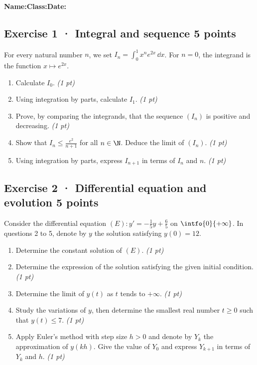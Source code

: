 \smallskip\textbf{Name:}\enspace\dotfill\quad\textbf{Class:}\enspace\dotfill\quad\textbf{Date:}\enspace\dotfill

\subsection*{Exercise 1 · Integral and sequence \hfill 5 points}For every natural number $n$, we set $I_n=\displaystyle\int_0^1x^ne^{2x}\,\dd x$. For $n=0$, the integrand is the function $x\mapsto e^{2x}$.

\begin{enumerate}

\item Calculate $I_0$. \hfill\textit{(1 pt)}

\item Using integration by parts, calculate $I_1$. \hfill\textit{(1 pt)}

\item Prove, by comparing the integrands, that the sequence $(I_n)$ is positive and decreasing. \hfill\textit{(1 pt)}

\item Show that $I_n\le\frac{e^{2}}{n+1}$ for all $n\in\N$. Deduce the limit of $(I_n)$. \hfill\textit{(1 pt)}

\item Using integration by parts, express $I_{n+1}$ in terms of $I_n$ and $n$. \hfill\textit{(1 pt)}

\end{enumerate}

\subsection*{Exercise 2 · Differential equation and evolution \hfill 5 points}Consider the differential equation $(E):y'=-\frac1{5}y+\frac{6}{5}$ on $\intfo{0}{+\infty}$. In questions 2 to 5, denote by $y$ the solution satisfying $y(0)=12$.

\begin{enumerate}

\item Determine the constant solution of $(E)$. \hfill\textit{(1 pt)}

\item Determine the expression of the solution satisfying the given initial condition. \hfill\textit{(1 pt)}

\item Determine the limit of $y(t)$ as $t$ tends to $+\infty$. \hfill\textit{(1 pt)}

\item Study the variations of $y$, then determine the smallest real number $t\ge0$ such that $y(t)\le7$. \hfill\textit{(1 pt)}

\item Apply Euler's method with step size $h>0$ and denote by $Y_k$ the approximation of $y(kh)$. Give the value of $Y_0$ and express $Y_{k+1}$ in terms of $Y_k$ and $h$. \hfill\textit{(1 pt)}

\end{enumerate}

